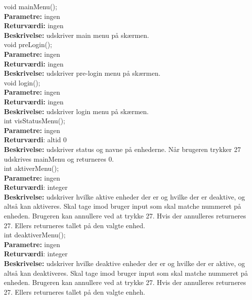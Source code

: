 void mainMenu(); \\
\textbf{Parametre:} ingen \\
\textbf{Returværdi:} ingen \\
\textbf{Beskrivelse:} udskriver main menu på skærmen. \\

void preLogin(); \\
\textbf{Parametre:} ingen \\
\textbf{Returværdi:} ingen \\
\textbf{Beskrivelse:} udskriver pre-login menu på skærmen. \\

void login(); \\
\textbf{Parametre:} ingen \\
\textbf{Returværdi:} ingen \\
\textbf{Beskrivelse:} udskriver login menu på skærmen. \\

int visStatusMenu(); \\
\textbf{Parametre:} ingen \\
\textbf{Returværdi}: altid 0 \\
\textbf{Beskrivelse:} udskriver status og navne på enhederne. Når brugeren trykker 27 udskrives mainMenu og returneres 0. \\

int aktiverMenu(); \\
\textbf{Parametre:} ingen \\
\textbf{Returværdi}: integer \\
\textbf{Beskrivelse:} udskriver hvilke aktive enheder der er og hvilke der er deaktive, og altså kan aktiveres. Skal tage imod bruger input som skal matche nummeret på enheden. Brugeren kan annullere ved at trykke 27. Hvis der annulleres returneres 27. Ellers returneres tallet på den valgte enhed. \\

int deaktiverMenu(); \\
\textbf{Parametre:} ingen \\
\textbf{Returværdi}: integer \\
\textbf{Beskrivelse:} udskriver hvilke deaktive enheder der er og hvilke der er aktive, og altså kan deaktiveres. Skal tage imod bruger input som skal matche nummeret på enheden. Brugeren kan annullere ved at trykke 27. Hvis der annulleres returneres 27. Ellers returneres tallet på den valgte enheh. \\

